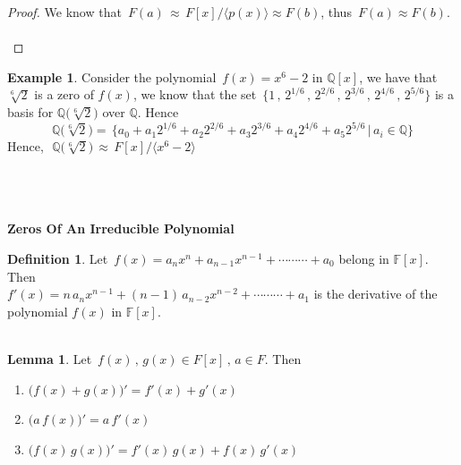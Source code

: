 \documentclass[11pt,a4paper]{article}
\theoremstyle{definition}
\newtheorem{defn}[thm]{Definition}
\newtheorem{exa}[thm]{Example}
\newtheorem{lem}[thm]{Lemma}
\begin{document}
\begin{proof}
We know that $\, F(a) \,\approx \,F[x]\big/\langle p(x)\rangle \approx F(b)$, thus $\, F(a)\approx F(b)$.\\\\
\end{proof}



\begin{exa}
Consider the polynomial $\, f(x) = x^6 - 2$ in $\mathbb{Q}[x]$, we have that $\sqrt[6]{2}$ is a zero of $f(x)$, we know that the set $\, \big\{1\, , \, 2^{1/6}\, , \, 2^{2/6}\, , \, 2^{3/6}\, , \, 2^{4/6}\, , \, 2^{5/6}\big\}$ is a basis for $\mathbb{Q}\big(\sqrt[6]{2}\big)$ over $\mathbb{Q}$. Hence 
$$\mathbb{Q}\big(\sqrt[6]{2}\big) = \, \big\{a_0 + a_1 2^{1/6} + a_2 2^{2/6} + a_3 2^{3/6} + a_4 2^{4/6} + a_5 2^{5/6}\, \big|\, a_i\in\mathbb{Q}\big\}$$
Hence, $\, \, \mathbb{Q}\big(\sqrt[6]{2}\big) \, \approx\, F[x]\big/\langle x^6 - 2\rangle$\\\\\\\\
\end{exa}







\textbf{Zeros Of An Irreducible Polynomial}\\

\begin{defn}
Let $\, f(x) = a_n x^n + a_{n-1} x^{n-1} + \cdots\cdots\cdots + a_0$ belong in $\mathbb{F}[x]$. Then\\ $f'(x) = n\, a_n x^{n-1} + (n-1)\, a_{n-2} x^{n-2} + \cdots\cdots\cdots + a_1$ is the derivative of the polynomial $f(x)$ in $\mathbb{F}[x]$.\\\\
\end{defn}






\begin{lem}
Let $\, f(x)\, , \, g(x)\in F[x]\, , \, a\in F$. Then 
\begin{enumerate}
\item[(i)] $\big(f(x) + g(x)\big)' = f'(x) + g'(x)$
\item[(ii)] $\big(a\, f(x)\big)' = a\, f'(x)$
\item[(iii)] $\big(f(x)\, g(x)\big)' = f'(x)\, g(x) + f(x)\, g'(x)$\\\\
\end{enumerate}
\end{lem}
\end{document}
